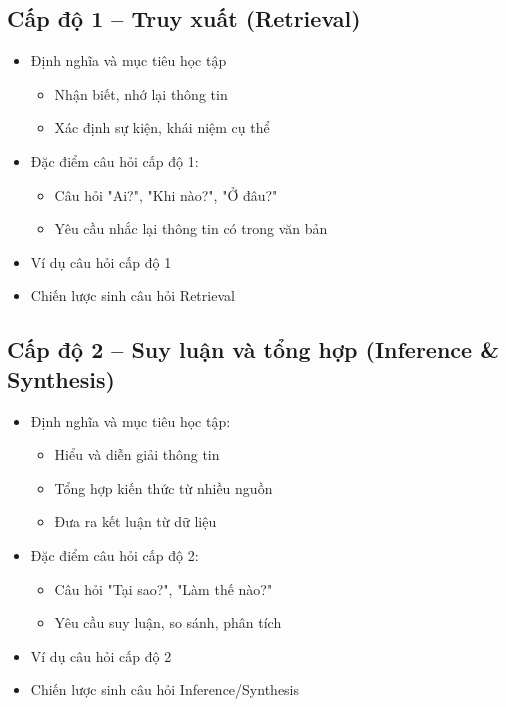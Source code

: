 \subsection{Cấp độ 1 -- Truy xuất (Retrieval)}
\begin{itemize}
    \item Định nghĩa và mục tiêu học tập
    \begin{itemize}
        \item Nhận biết, nhớ lại thông tin
        \item Xác định sự kiện, khái niệm cụ thể
    \end{itemize}
    \item Đặc điểm câu hỏi cấp độ 1:
    \begin{itemize}
        \item Câu hỏi "Ai?", "Khi nào?", "Ở đâu?"
        \item Yêu cầu nhắc lại thông tin có trong văn bản
    \end{itemize}
    \item Ví dụ câu hỏi cấp độ 1
    \item Chiến lược sinh câu hỏi Retrieval
\end{itemize}

\subsection{Cấp độ 2 -- Suy luận và tổng hợp (Inference \& Synthesis)}
\begin{itemize}
    \item Định nghĩa và mục tiêu học tập:
    \begin{itemize}
        \item Hiểu và diễn giải thông tin
        \item Tổng hợp kiến thức từ nhiều nguồn
        \item Đưa ra kết luận từ dữ liệu
    \end{itemize}
    \item Đặc điểm câu hỏi cấp độ 2:
    \begin{itemize}
        \item Câu hỏi "Tại sao?", "Làm thế nào?"
        \item Yêu cầu suy luận, so sánh, phân tích
    \end{itemize}
    \item Ví dụ câu hỏi cấp độ 2
    \item Chiến lược sinh câu hỏi Inference/Synthesis
\end{itemize}

